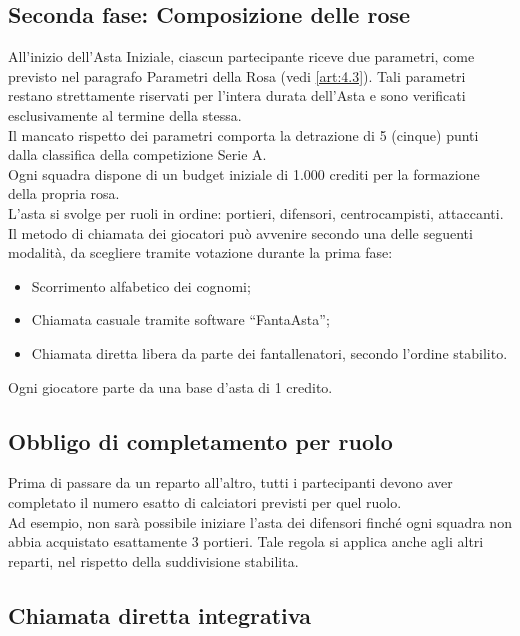 \subsection{Seconda fase: Composizione delle rose}
\label{art:4.4.2}
All’inizio dell’Asta Iniziale, ciascun partecipante riceve due parametri, come previsto nel paragrafo Parametri della Rosa (vedi \ref{art:4.3}). Tali parametri restano strettamente riservati per l’intera durata dell’Asta e sono verificati esclusivamente al termine della stessa. \\
Il mancato rispetto dei parametri comporta la detrazione di 5 (cinque) punti dalla classifica della competizione Serie A. \\

Ogni squadra dispone di un budget iniziale di 1.000 crediti per la formazione della propria rosa.\\
L'asta si svolge per ruoli in ordine: portieri, difensori, centrocampisti, attaccanti.\\
Il metodo di chiamata dei giocatori può avvenire secondo una delle seguenti modalità, da scegliere tramite votazione durante la prima fase:
\begin{itemize}
\item Scorrimento alfabetico dei cognomi;
\item Chiamata casuale tramite software “FantaAsta”;
\item Chiamata diretta libera da parte dei fantallenatori, secondo l'ordine stabilito.
\end{itemize}

\noindent
Ogni giocatore parte da una base d'asta di 1 credito.

\subsection{Obbligo di completamento per ruolo}
\label{art:4.4.3}

Prima di passare da un reparto all'altro, tutti i partecipanti devono aver completato il numero esatto di calciatori previsti per quel ruolo.\\
Ad esempio, non sarà possibile iniziare l'asta dei difensori finché ogni squadra non abbia acquistato esattamente 3 portieri. Tale regola si applica anche agli altri reparti, nel rispetto della suddivisione stabilita.

\subsection{Chiamata diretta integrativa}
\label{art:4.4.4}

